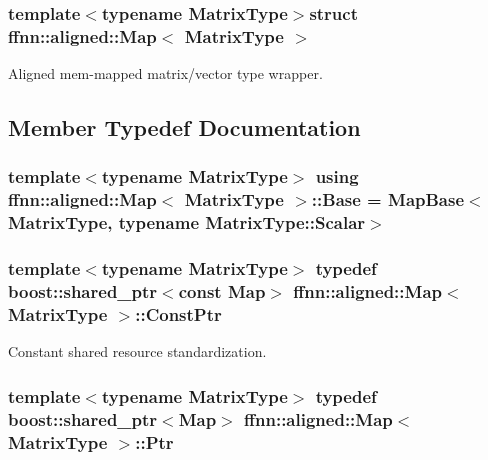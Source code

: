 \subsubsection*{template$<$typename Matrix\-Type$>$struct ffnn\-::aligned\-::\-Map$<$ Matrix\-Type $>$}

Aligned mem-\/mapped matrix/vector type wrapper. 

\subsection{Member Typedef Documentation}
\hypertarget{structffnn_1_1aligned_1_1_map_ae7cf0913401f02f960a7addcf5bd60bf}{
\subsubsection[{Base}]{\setlength{\rightskip}{0pt plus 5cm}template$<$typename Matrix\-Type$>$ using {\bf ffnn\-::aligned\-::\-Map}$<$ Matrix\-Type $>$\-::{\bf Base} =  {\bf Map\-Base}$<$Matrix\-Type, typename Matrix\-Type\-::\-Scalar$>$}}\label{structffnn_1_1aligned_1_1_map_ae7cf0913401f02f960a7addcf5bd60bf}
\hypertarget{structffnn_1_1aligned_1_1_map_ad9a5f18197cbcf6691a4ee07fa389cac}{
\subsubsection[{Const\-Ptr}]{\setlength{\rightskip}{0pt plus 5cm}template$<$typename Matrix\-Type$>$ typedef boost\-::shared\-\_\-ptr$<$const {\bf Map}$>$ {\bf ffnn\-::aligned\-::\-Map}$<$ Matrix\-Type $>$\-::{\bf Const\-Ptr}}}\label{structffnn_1_1aligned_1_1_map_ad9a5f18197cbcf6691a4ee07fa389cac}


Constant shared resource standardization. 

\hypertarget{structffnn_1_1aligned_1_1_map_afe68a9534e6614c3524e95c6cdcd50fc}{
\subsubsection[{Ptr}]{\setlength{\rightskip}{0pt plus 5cm}template$<$typename Matrix\-Type$>$ typedef boost\-::shared\-\_\-ptr$<${\bf Map}$>$ {\bf ffnn\-::aligned\-::\-Map}$<$ Matrix\-Type $>$\-::{\bf Ptr}}}\label{structffnn_1_1aligned_1_1_map_afe68a9534e6614c3524e95c6cdcd50fc}


